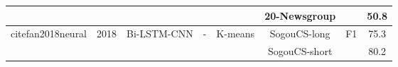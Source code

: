 \documentclass[12pt, a4paper, oneside]{report}
\begin{document}
\begin{tabular}{|c|c|c|c|c|c|cc|}
                                                                          &                       &                                   &                                         &                                                                                                        & 20-Newsgroup                          & \multicolumn{1}{c|}{}                                                                                                              & 50.8   \\ \hline
    \multirow{2}{*}{cite{fan2018neural}}                & \multirow{2}{*}{2018} & \multirow{2}{*}{Bi-LSTM-CNN}      & \multirow{2}{*}{-}                      & \multirow{2}{*}{K-means}                                                                               & SogouCS-long                          & \multicolumn{1}{c|}{\multirow{2}{*}{F1}}                                                                                           & 75.3   \\ \cline{6-6} \cline{8-8} 
                                                                          &                       &                                   &                                         &                                                                                                        & SogouCS-short                         & \multicolumn{1}{c|}{}                                                                                                              & 80.2   \\ \hline
\end{tabular}
\end{document}
